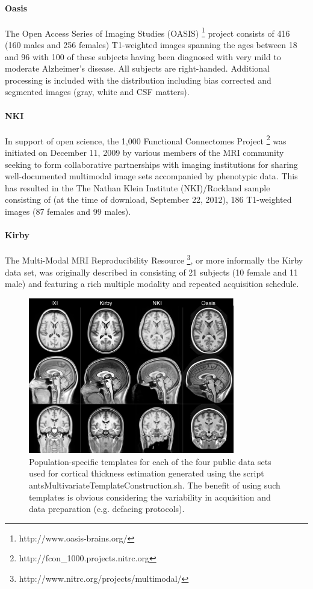\paragraph{Oasis}
The Open Access Series of Imaging Studies (OASIS)%
\footnote{
http://www.oasis-brains.org/
}
 project consists of 416
(160 males and 256 females) T1-weighted images spanning 
the ages between 18 and 96 with 100 of these subjects having been 
diagnosed with very mild to moderate Alzheimer's disease.  
All subjects are right-handed.  Additional processing is included
with the distribution including bias corrected and segmented images
(gray, white and CSF matters).

\paragraph{NKI}
In support of open science, the 1,000 Functional Connectomes Project%
\footnote{ 
http://fcon\_1000.projects.nitrc.org
}
was initiated on December 11, 2009 by various members of the MRI community
seeking to form collaborative partnerships with imaging institutions for 
sharing well-documented multimodal image sets accompanied by phenotypic data.
This has resulted in the The Nathan Klein Institute (NKI)/Rockland sample
consisting of (at the time of download, September 22, 2012), 186 T1-weighted
images (87 females and 99 males).

\paragraph{Kirby}
The Multi-Modal MRI Reproducibility Resource%
\footnote{
http://www.nitrc.org/projects/multimodal/
}, 
or more informally the Kirby
data set, was originally described in \cite{landman2011} consisting of 
21 subjects (10 female and 11 male) and featuring a rich multiple modality and 
repeated acquisition schedule.

\begin{figure}
  \centering
  \includegraphics[width=90mm]{Figures/templates.pdf}
  \caption{Population-specific templates for each of the four public data sets used 
  for cortical thickness 
  estimation generated using the script antsMultivariateTemplateConstruction.sh. 
  The benefit of using such templates is obvious considering the variability in
  acquisition and data preparation (e.g. defacing protocols).
  }
  \label{fig:template}
\end{figure}


